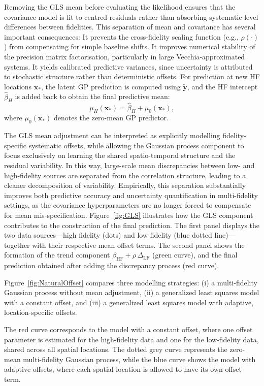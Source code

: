\documentclass[12pt]{article}
\begin{document}
Removing the GLS mean before evaluating the likelihood ensures that the covariance model is fit to centred residuals rather than absorbing systematic level differences between fidelities. This separation of mean and covariance has several important consequences:
 It prevents the cross-fidelity scaling function (e.g., $\rho(\cdot)$) from compensating for simple baseline shifts. It improves numerical stability of the precision matrix factorisation, particularly in large Vecchia-approximated systems. It yields calibrated predictive variances, since uncertainty is attributed to stochastic structure rather than deterministic offsets. For prediction at new HF locations $\bm{x}_\ast$, the latent GP prediction is computed using $\tilde{\bm{y}}$, and the HF intercept $\hat{\beta}_H$ is added back to obtain the final predictive mean:
\[
\mu_H(\bm{x}_\ast) = \hat{\beta}_H + \mu_0(\bm{x}_\ast),
\]
where $\mu_0(\bm{x}_\ast)$ denotes the zero-mean GP predictor.

The GLS mean adjustment can be interpreted as explicitly modelling
fidelity-specific systematic offsets, while allowing the Gaussian
process component to focus exclusively on learning the shared
spatio-temporal structure and the residual variability.
In this way, large-scale mean discrepancies between low- and
high-fidelity sources are separated from the correlation structure,
leading to a cleaner decomposition of variability.
Empirically, this separation substantially improves both predictive
accuracy and uncertainty quantification in multi-fidelity settings,
as the covariance hyperparameters are no longer forced to compensate
for mean mis-specification.
Figure~\ref{fig:GLS} illustrates how the GLS component contributes
to the construction of the final prediction.
The first panel displays the two data sources—high fidelity (dots)
and low fidelity (blue dotted line)—together with their respective
mean offset terms.
The second panel shows the formation of the trend component
$\beta_{\mathrm{HF}} + \rho \,\Delta_{\mathrm{LF}}$ (green curve),
and the final prediction obtained after adding the discrepancy
process (red curve).


Figure~\ref{fig:NaturalOffset} compares three modelling strategies:
(i) a multi-fidelity Gaussian process without mean adjustment,
(ii) a generalized least squares model with a constant offset,
and (iii) a generalized least squares model with adaptive, location-specific offsets.

The red curve corresponds to the model with a constant offset,
where one offset parameter is estimated for the high-fidelity data
and one for the low-fidelity data, shared across all spatial locations.
The dotted grey curve represents the zero-mean multi-fidelity Gaussian process,
while the blue curve shows the model with adaptive offsets,
where each spatial location is allowed to have its own offset term.
\end{document}
